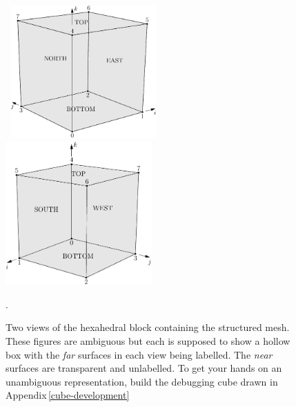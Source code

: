  
\begin{figure}[htbp]
\mbox{
\includegraphics[width=0.5\textwidth]{figs/block3d-defn.pdf}
\includegraphics[width=0.5\textwidth]{figs/block3d-defn-2.pdf}
}
\caption{Two views of the hexahedral block containing the structured mesh.
    These figures are ambiguous but each is supposed to show a hollow box
    with the \textit{far} surfaces in each view being labelled.  
    The \textit{near} surfaces are transparent and unlabelled.
    To get your hands on an unambiguous representation, build the debugging cube
    drawn in Appendix\,\ref{cube-development}}.
\label{block-defn-fig}
\end{figure}

